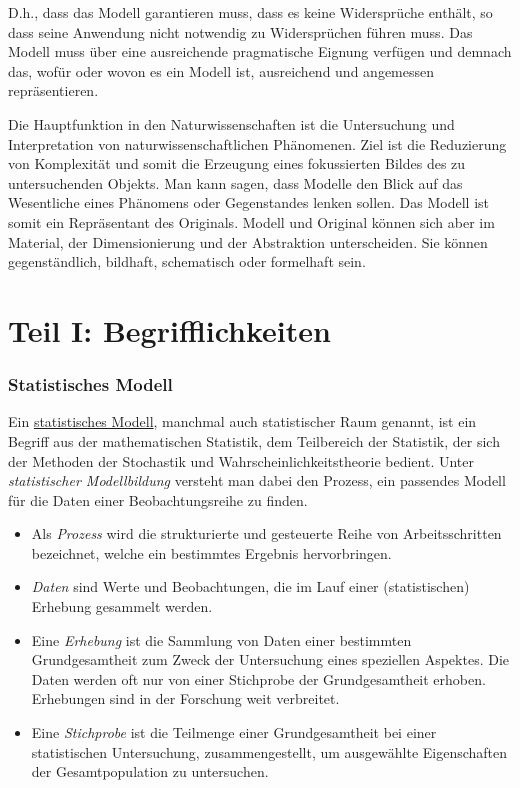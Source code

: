 \documentclass[]{article}
\providecommand{\tightlist}{%
  \setlength{\itemsep}{0pt}\setlength{\parskip}{0pt}}
\begin{document}
D.h., dass das Modell garantieren muss, dass es keine Widersprüche
enthält, so dass seine Anwendung nicht notwendig zu Widersprüchen führen
muss. Das Modell muss über eine ausreichende pragmatische Eignung
verfügen und demnach das, wofür oder wovon es ein Modell ist,
ausreichend und angemessen repräsentieren.

Die Hauptfunktion in den Naturwissenschaften ist die Untersuchung und
Interpretation von naturwissenschaftlichen Phänomenen. Ziel ist die
Reduzierung von Komplexität und somit die Erzeugung eines fokussierten
Bildes des zu untersuchenden Objekts. Man kann sagen, dass Modelle den
Blick auf das Wesentliche eines Phänomens oder Gegenstandes lenken
sollen. Das Modell ist somit ein Repräsentant des Originals. Modell und
Original können sich aber im Material, der Dimensionierung und der
Abstraktion unterscheiden. Sie können gegenständlich, bildhaft,
schematisch oder formelhaft sein.

\part*{Teil I:
Begrifflichkeiten}\label{part-teil-i-begrifflichkeiten}

\section*{Statistisches Modell}\label{statistisches-modell}

Ein
\href{https://de.wikipedia.org/wiki/Statistisches_Modell}{statistisches
Modell}, manchmal auch statistischer Raum genannt, ist ein Begriff aus
der mathematischen Statistik, dem Teilbereich der Statistik, der sich
der Methoden der Stochastik und Wahrscheinlichkeitstheorie bedient.
Unter \emph{statistischer Modellbildung} versteht man dabei den Prozess,
ein passendes Modell für die Daten einer Beobachtungsreihe zu finden.

\begin{itemize}
\tightlist
\item
  Als \emph{Prozess} wird die strukturierte und gesteuerte Reihe von
  Arbeitsschritten bezeichnet, welche ein bestimmtes Ergebnis
  hervorbringen.
\item
  \emph{Daten} sind Werte und Beobachtungen, die im Lauf einer
  (statistischen) Erhebung gesammelt werden.
\item
  Eine \emph{Erhebung} ist die Sammlung von Daten einer bestimmten
  Grundgesamtheit zum Zweck der Untersuchung eines speziellen Aspektes.
  Die Daten werden oft nur von einer Stichprobe der Grundgesamtheit
  erhoben. Erhebungen sind in der Forschung weit verbreitet.
\item
  Eine \emph{Stichprobe} ist die Teilmenge einer Grundgesamtheit bei
  einer statistischen Untersuchung, zusammengestellt, um ausgewählte
  Eigenschaften der Gesamtpopulation zu untersuchen.
\end{itemize}
\end{document}
